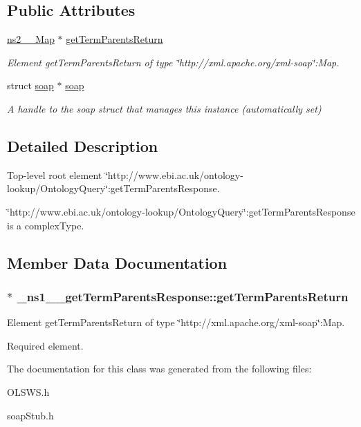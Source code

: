 \subsection*{Public Attributes}
\begin{DoxyCompactItemize}
\item 
\hyperlink{classns2____Map}{ns2\_\-\_\-Map} $\ast$ \hyperlink{class__ns1____getTermParentsResponse_a2446e9c5d9051a8620c02cb15fea9227}{getTermParentsReturn}
\begin{DoxyCompactList}\small\item\em Element getTermParentsReturn of type \char`\"{}http://xml.apache.org/xml-\/soap\char`\"{}:Map. \end{DoxyCompactList}\item 
\hypertarget{class__ns1____getTermParentsResponse_a864ae09bee9da90a5fbdc142d57620d4}{
struct \hyperlink{class__ns1____getTermParentsResponse_a864ae09bee9da90a5fbdc142d57620d4}{soap} $\ast$ \hyperlink{class__ns1____getTermParentsResponse_a864ae09bee9da90a5fbdc142d57620d4}{soap}}
\label{class__ns1____getTermParentsResponse_a864ae09bee9da90a5fbdc142d57620d4}

\begin{DoxyCompactList}\small\item\em A handle to the soap struct that manages this instance (automatically set) \end{DoxyCompactList}\end{DoxyCompactItemize}


\subsection{Detailed Description}
Top-\/level root element \char`\"{}http://www.ebi.ac.uk/ontology-\/lookup/OntologyQuery\char`\"{}:getTermParentsResponse. 

\char`\"{}http://www.ebi.ac.uk/ontology-\/lookup/OntologyQuery\char`\"{}:getTermParentsResponse is a complexType. 

\subsection{Member Data Documentation}
\hypertarget{class__ns1____getTermParentsResponse_a2446e9c5d9051a8620c02cb15fea9227}{
\subsubsection[{getTermParentsReturn}]{ $\ast$ {\bf \_\-ns1\_\-\_\-getTermParentsResponse::getTermParentsReturn}}}
\label{class__ns1____getTermParentsResponse_a2446e9c5d9051a8620c02cb15fea9227}


Element getTermParentsReturn of type \char`\"{}http://xml.apache.org/xml-\/soap\char`\"{}:Map. 

Required element. 

The documentation for this class was generated from the following files:\begin{DoxyCompactItemize}
\item 
OLSWS.h\item 
soapStub.h\end{DoxyCompactItemize}
